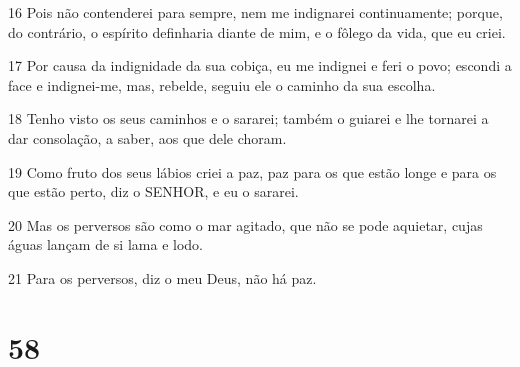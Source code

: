 \par 16 Pois não contenderei para sempre, nem me indignarei continuamente; porque, do contrário, o espírito definharia diante de mim, e o fôlego da vida, que eu criei.
\par 17 Por causa da indignidade da sua cobiça, eu me indignei e feri o povo; escondi a face e indignei-me, mas, rebelde, seguiu ele o caminho da sua escolha.
\par 18 Tenho visto os seus caminhos e o sararei; também o guiarei e lhe tornarei a dar consolação, a saber, aos que dele choram.
\par 19 Como fruto dos seus lábios criei a paz, paz para os que estão longe e para os que estão perto, diz o SENHOR, e eu o sararei.
\par 20 Mas os perversos são como o mar agitado, que não se pode aquietar, cujas águas lançam de si lama e lodo.
\par 21 Para os perversos, diz o meu Deus, não há paz.

\chapter{58}

